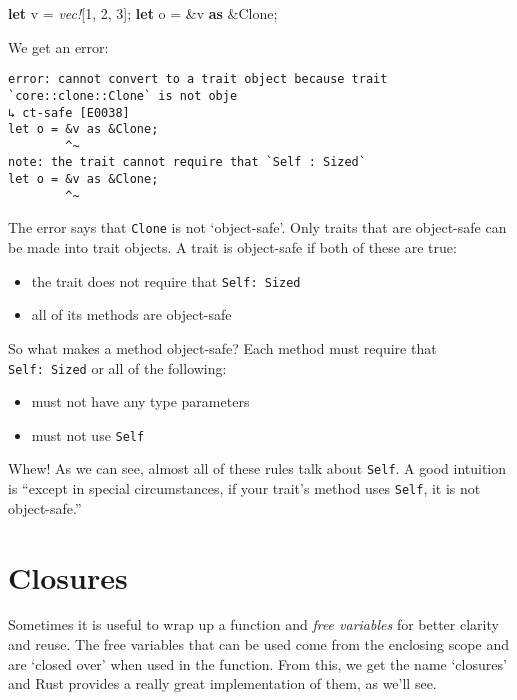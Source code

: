 \documentclass[a4paper,]{book}
\newenvironment{Shaded}{\begin{snugshade}}{\end{snugshade}}
\newcommand{\KeywordTok}[1]{\textcolor[rgb]{0.13,0.29,0.53}{\textbf{{#1}}}}
\newcommand{\DecValTok}[1]{\textcolor[rgb]{0.00,0.00,0.81}{{#1}}}
\newcommand{\BuiltInTok}[1]{{#1}}
\newcommand{\PreprocessorTok}[1]{\textcolor[rgb]{0.56,0.35,0.01}{\textit{{#1}}}}
\newcommand{\NormalTok}[1]{{#1}}
\providecommand{\tightlist}{%
  \setlength{\itemsep}{0pt}\setlength{\parskip}{0pt}}
\begin{document}
\begin{Shaded}
\begin{Highlighting}[]
\KeywordTok{let} \NormalTok{v = }\PreprocessorTok{vec!}\NormalTok{[}\DecValTok{1}\NormalTok{, }\DecValTok{2}\NormalTok{, }\DecValTok{3}\NormalTok{];}
\KeywordTok{let} \NormalTok{o = &v }\KeywordTok{as} \NormalTok{&}\BuiltInTok{Clone}\NormalTok{;}
\end{Highlighting}
\end{Shaded}

We get an error:

\begin{verbatim}
error: cannot convert to a trait object because trait `core::clone::Clone` is not obje
↳ ct-safe [E0038]
let o = &v as &Clone;
        ^~
note: the trait cannot require that `Self : Sized`
let o = &v as &Clone;
        ^~
\end{verbatim}

The error says that \texttt{Clone} is not `object-safe'. Only traits
that are object-safe can be made into trait objects. A trait is
object-safe if both of these are true:

\begin{itemize}
\tightlist
\item
  the trait does not require that \texttt{Self:\ Sized}
\item
  all of its methods are object-safe
\end{itemize}

So what makes a method object-safe? Each method must require that
\texttt{Self:\ Sized} or all of the following:

\begin{itemize}
\tightlist
\item
  must not have any type parameters
\item
  must not use \texttt{Self}
\end{itemize}

Whew! As we can see, almost all of these rules talk about \texttt{Self}.
A good intuition is ``except in special circumstances, if your trait's
method uses \texttt{Self}, it is not object-safe.''

\hypertarget{sec--closures}{\section{Closures}\label{sec--closures}}

Sometimes it is useful to wrap up a function and \emph{free variables}
for better clarity and reuse. The free variables that can be used come
from the enclosing scope and are `closed over' when used in the
function. From this, we get the name `closures' and Rust provides a
really great implementation of them, as we'll see.
\end{document}
